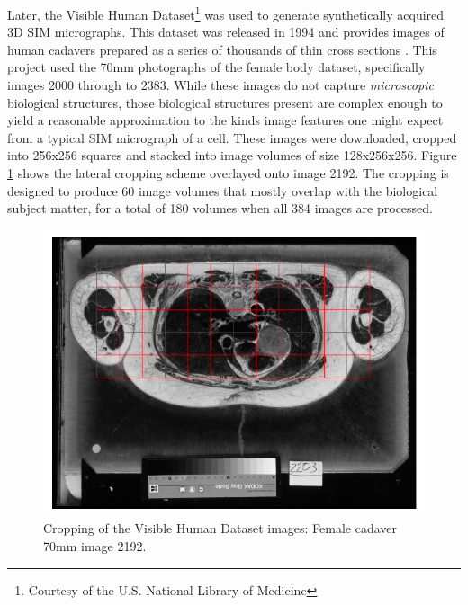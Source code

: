\documentclass[12pt]{article}
\begin{document}
Later, the Visible Human Dataset\footnote{Courtesy of the U.S. National Library of Medicine} was used to generate synthetically acquired 3D SIM micrographs.
This dataset was released in 1994 and provides images of human cadavers prepared as a series of thousands of thin cross sections \cite{vhdata}.
This project used the 70mm photographs of the female body dataset, specifically images 2000 through to 2383.
While these images do not capture \textit{microscopic} biological structures,
those biological structures present are complex enough to yield a reasonable approximation to the kinds image features one might expect from a typical SIM micrograph of a cell.
These images were downloaded, cropped into 256x256 squares and stacked into image volumes of size 128x256x256.
Figure \ref{fig:vhcrop} shows the lateral cropping scheme overlayed onto image 2192.
The cropping is designed to produce 60 image volumes that mostly overlap with the biological subject matter,
for a total of 180 volumes when all 384 images are processed.

\begin{figure}[hbtp]
    \includegraphics[scale=0.65, center]{figures/visible_human_volumes_grey.png}
    \caption{Cropping of the Visible Human Dataset images: Female cadaver 70mm image 2192.}
    \label{fig:vhcrop}
\end{figure}
\end{document}

